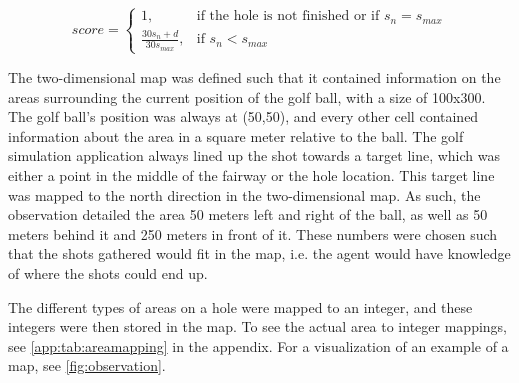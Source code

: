 \documentclass{kththesis}
\begin{document}
\begin{equation}
\label{eq:agentscore}
score = 
\begin{cases}
1,& \text{if the hole is not finished or if } s_n = s_{max}\\
\frac{30s_n + d}{30s_{max}},& \text{if } s_n < s_{max}
\end{cases}
\end{equation}

The two-dimensional map was defined such that it contained information on the areas surrounding the current position of the golf ball, with a size of 100x300. The golf ball's position was always at (50,50), and every other cell contained information about the area in a square meter relative to the ball. The golf simulation application always lined up the shot towards a target line, which was either a point in the middle of the fairway or the hole location. This target line was mapped to the north direction in the two-dimensional map. As such, the observation detailed the area 50 meters left and right of the ball, as well as 50 meters behind it and 250 meters in front of it. These numbers were chosen such that the shots gathered would fit in the map, i.e. the agent would have knowledge of where the shots could end up. 

The different types of areas on a hole were mapped to an integer, and these integers were then stored in the map. To see the actual area to integer mappings, see \autoref{app:tab:areamapping} in the appendix. For a visualization of an example of a map, see \autoref{fig:observation}.
\end{document}
